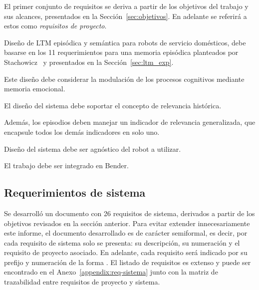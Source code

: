 El primer conjunto de requisitos se deriva a partir de los objetivos del trabajo y sus alcances, presentados en la Sección~\ref{sec:objetivos}. En adelante se referirá a estos como \textit{requisitos de proyecto}.
\begin{description}
\item {} Diseño de LTM episódica y semántica para robots de servicio domésticos, debe basarse en los 11 requerimientos para una memoria episódica planteados por Stachowicz~\cite{Stachowicz2012} y presentados en la Sección~\ref{sec:ltm_exp}.
\item {} Este diseño debe considerar la modulación de los procesos cognitivos mediante memoria emocional.
\item {} El diseño del sistema debe soportar el concepto de relevancia histórica.
\item {} Además, los episodios deben manejar un indicador de relevancia generalizada, que encapsule todos los demás indicadores en solo uno.
\item {} Diseño del sistema debe ser agnóstico del robot a utilizar.
\item {} El trabajo debe ser integrado en Bender.
\end{description}


\subsection{Requerimientos de sistema}

Se desarrolló un documento con 26 requisitos de sistema, derivados a partir de los objetivos revisados en la sección anterior. Para evitar extender innecesariamente este informe, el documento desarrollado es de carácter semiformal, es decir, por cada requisito de sistema solo se presenta: su descripción, su numeración y el requisito de proyecto asociado. En adelante, cada requisito será indicado por su prefijo y numeración de la forma . El listado de requisitos es extenso y puede ser encontrado en el Anexo~\ref{appendix:req-sistema} junto con la matriz de trazabilidad entre requisitos de proyecto y sistema.

